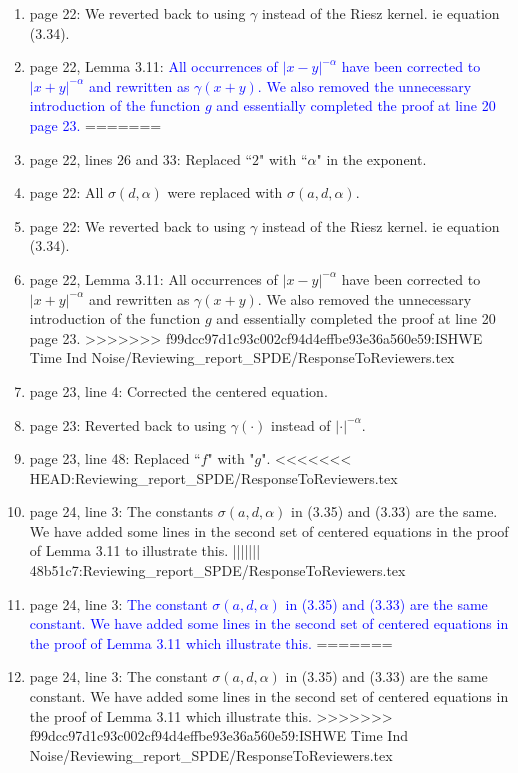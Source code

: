 \documentclass[12pt]{article}%
\theoremstyle{plain}
\theoremstyle{definition}
\numberwithin{equation}{section}
\begin{document}
\begin{enumerate}
  \item[43.] page 22: We reverted back to using $\gamma$ instead of the Riesz kernel. ie equation
    (3.34).
  \item[44.] page 22, Lemma 3.11: \textcolor{blue}{All occurrences of  $|x-y|^{-\alpha}$ have been corrected to $|x+y|^{-\alpha}$ and rewritten as $\gamma(x+y)$. We also removed the unnecessary introduction of the function $g$ and essentially completed the proof at line 20 page 23.}
=======
  \item[41.] page 22, lines 26 and 33: Replaced ``$2$" with ``$\alpha$" in the exponent.
  \item[42.] page 22: All $\sigma(d,\alpha)$ were replaced with $\sigma(a,d,\alpha)$.
  \item[43.] page 22: We reverted back to using $\gamma$ instead of the Riesz kernel. ie equation
    (3.34).
  \item[44.] page 22, Lemma 3.11: All occurrences of  $|x-y|^{-\alpha}$ have been corrected to $|x+y|^{-\alpha}$ and rewritten as $\gamma(x+y)$. We also removed the unnecessary introduction of the function $g$ and essentially completed the proof at line 20 page 23.
>>>>>>> f99dcc97d1c93c002cf94d4effbe93e36a560e59:ISHWE Time Ind Noise/Reviewing_report_SPDE/ResponseToReviewers.tex

  \item[45.] page 23, line 4: Corrected the centered equation.
  \item[46.] page 23: Reverted back to using $\gamma(\cdot)$ instead of
    $|\cdot|^{-\alpha}$.
  \item[47.] page 23, line 48: Replaced ``$f$" with "$g$".
<<<<<<< HEAD:Reviewing_report_SPDE/ResponseToReviewers.tex
  \item[48.] page 24, line 3: The constants $\sigma(a, d, \alpha)$ in (3.35)
    and (3.33) are the same. We have added some lines in the second set of
    centered equations in the proof of Lemma 3.11 to illustrate this.
||||||| 48b51c7:Reviewing_report_SPDE/ResponseToReviewers.tex
  \item[48.] page 24, line 3: \textcolor{blue}{The constant $\sigma(a, d, \alpha)$ in (3.35) and (3.33) are the same constant. We have added some lines in the second set of centered equations in the proof of Lemma 3.11 which illustrate this.}
=======
  \item[48.] page 24, line 3: The constant $\sigma(a, d, \alpha)$ in (3.35) and (3.33) are the same constant. We have added some lines in the second set of centered equations in the proof of Lemma 3.11 which illustrate this.
>>>>>>> f99dcc97d1c93c002cf94d4effbe93e36a560e59:ISHWE Time Ind Noise/Reviewing_report_SPDE/ResponseToReviewers.tex


\end{enumerate}
\end{document}
